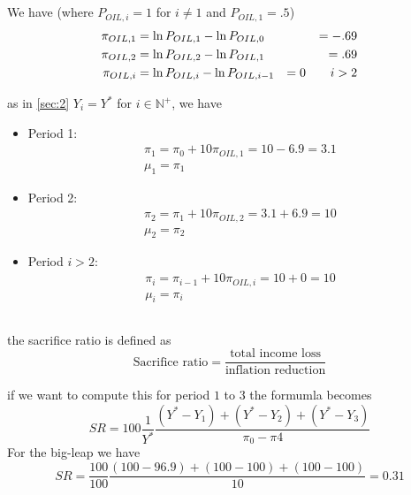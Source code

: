 \documentclass[a4paper] {scrartcl}
\begin{document}
\subsection{ }
We have (where $P_{OIL, i}=1$ for $i\neq1$ and $P_{OIL,1}=.5$)
\begin{eqnarray}
	\label{eq:log}
	\pi_{OIL, 1} &= \ln{P_{OIL, 1}}-\ln{P_{OIL, 0}} &=-.69\\
	\pi_{OIL, 2} &= \ln{P_{OIL, 2}}-\ln{P_{OIL, 1}} &=.69\\
	\pi_{OIL, i} &= \ln{P_{OIL, i}}-\ln{P_{OIL, i-1}} &=0 \hspace{7 mm}i >2
\end{eqnarray}

as in \ref{sec:2} $Y_i=Y^*$ for $i\in\mathbb N^+$, we have
\begin{itemize}
	\item Period 1:
	\begin{eqnarray}
		\pi_1 = \pi_{0} + 10\pi_{OIL, 1}=10-6.9=3.1\\
		\mu_1 = \pi_1
	\end{eqnarray}
	\item Period 2:
	\begin{eqnarray}
		\pi_2 = \pi_{1} +  10\pi_{OIL, 2}=3.1+6.9 = 10\\
		\mu_2 = \pi_2
	\end{eqnarray}
	\item Period $i>2$:
	\begin{eqnarray}
		\pi_i = \pi_{i-1} +  10\pi_{OIL, i}=10 + 0 = 10\\
		\mu_i = \pi_i
	\end{eqnarray}
\end{itemize}

\subsection{ }
the sacrifice ratio is defined as
\begin{equation}
	\text{Sacrifice ratio} = \frac{\text{total income loss}}{\text{inflation reduction}}
\end{equation}

if we want to compute this for period $1$ to $3$ the formumla becomes
\begin{equation}
	\label{eq:SR}
	SR = 100\frac{1}{Y^*}\frac{(Y^*-Y_1)+(Y^*-Y_2)+(Y^*-Y_3)}{\pi_0-\pi4}
\end{equation}
For the big-leap we have
\begin{equation}
	SR = \frac{100}{100}\frac{(100-96.9)+(100-100)+(100-100)}{10} = 0.31
\end{equation}
\end{document}
